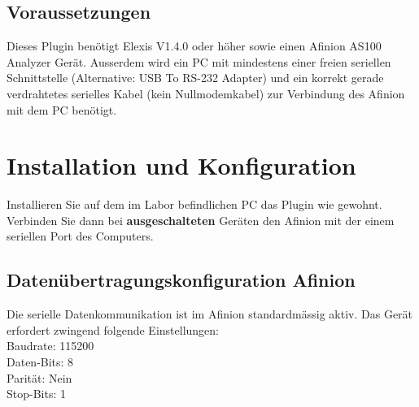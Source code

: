 \documentclass[a4paper]{scrartcl}
\begin{document}
\subsection{Voraussetzungen}
Dieses Plugin ben\"otigt Elexis V1.4.0 oder h\"oher sowie einen Afinion AS100 Analyzer Ger\"at. Ausserdem wird ein PC mit mindestens einer freien seriellen Schnittstelle (Alternative: USB To RS-232 Adapter) und ein korrekt gerade verdrahtetes serielles Kabel (kein Nullmodemkabel) zur Verbindung des Afinion mit dem PC ben\"otigt.

\section{Installation und Konfiguration}
Installieren Sie auf dem im Labor befindlichen PC das Plugin wie gewohnt. Verbinden Sie dann bei \textbf{ausgeschalteten} Ger\"aten den Afinion mit der einem seriellen Port des Computers. 
\subsection{Daten\"ubertragungskonfiguration Afinion}
Die serielle Datenkommunikation ist im Afinion standardm\"assig aktiv. Das Ger\"at erfordert zwingend folgende Einstellungen:\\
Baudrate: 115200\\
Daten-Bits: 8\\
Parit\"at: Nein\\
Stop-Bits: 1
\end{document}
